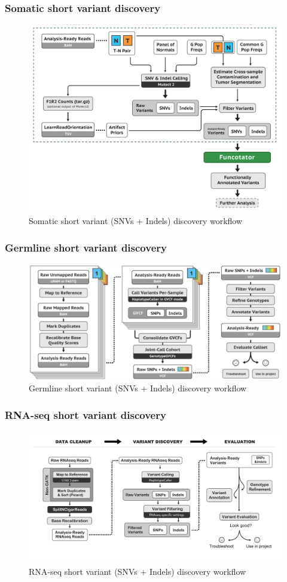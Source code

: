 \documentclass{beamer}
\begin{document}
    \begin{frame}
        \frametitle{Somatic short variant discovery}

        \begin{figure}
            \includegraphics[width=0.7 \linewidth]{figures/Workflow/somatic_short_variants.png}
            \caption{Somatic short variant (SNVs + Indels) discovery workflow \protect\cite{gatk1, gatk2}}
        \end{figure}
    \end{frame}

    \begin{frame}
        \frametitle{Germline short variant discovery}

        \begin{figure}
            \includegraphics[width=0.7 \linewidth]{figures/Workflow/germline_short_variant.png}
            \caption{Germline short variant (SNVs + Indels) discovery workflow \protect\cite{gatk1, gatk2}}
        \end{figure}
    \end{frame}

    \begin{frame}
        \frametitle{RNA-seq short variant discovery}

        \begin{figure}
            \includegraphics[width=0.8 \linewidth]{figures/Workflow/RNA_short_variant.png}
            \caption{RNA-seq short variant (SNVs + Indels) discovery workflow \protect\cite{gatk1, gatk2}}
        \end{figure}
    \end{frame}
\end{document}
